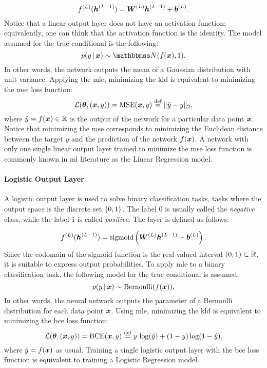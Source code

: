 $$\Layer{f}{L}(\LayerVector{h}{L-1}) = \LayerMatrix{W}{L} \LayerVector{h}{L-1} + \LayerVector{b}{L}.$$
Notice that a linear output layer does not have an activation function; equivalently, one can think that the activation function is the identity. The model assumed for the true conditional is the following:
$$p(y \given \Vector{x}) \sim \Normal{f(\Vector{x})}{1}.$$
In other words, the network outputs the mean of a Gaussian distribution with unit variance. Applying the \gls{mle}, minimizing the \gls{kld} is equivalent to minimizing the \gls{mse} loss function:
$$\Loss(\Param, (\Vector{x}, y)) =\Fun{MSE}(\Vector{x}, y) \defeq \norm{\hat{y} - y}_2,$$
where $\hat{y} = f(\Vector{x}) \in \Real$ is the output of the network for a particular data point $\Vector{x}$.
Notice that minimizing the \gls{mse} corresponds to minimizing the Euclidean distance between the target $y$ and the prediction of the network $f(\Vector{x})$. A network with only one single linear output layer trained to minimize the \gls{mse} loss function is commonly known in \gls{ml} literature as the Linear Regression model.

\paragraph{Logistic Output Layer}
A logistic output layer is used to solve binary classification tasks, \ie tasks where the output space is the discrete set $\left\{ 0, 1 \right\}$. The label 0 is usually called the \emph{negative} class, while the label 1 is called \emph{positive}. The layer is defined as follows:

$$\Layer{f}{L}(\LayerVector{h}{L-1}) = \sigmoid \Par{\LayerMatrix{W}{L} \LayerVector{h}{L-1} + \LayerVector{b}{L}}.$$
Since the codomain of the sigmoid function is the real-valued interval $(0, 1) \subset \mathbb{R}$, it is suitable to express output probabilities. To apply \gls{mle} to a binary classification task, the following model for the true conditional is assumed:
$$p(y \given \Vector{x}) \sim \Fun{Bernoulli}(f(\Vector{x})),$$
In other words, the neural network outputs the parameter of a Bernoulli distribution for each data point $\Vector{x}$. Using \gls{mle}, minimizing the \gls{kld} is equivalent to minimizing the \gls{bce} loss function:
$$\Loss(\Param, (\Vector{x}, y)) = \Fun{BCE}(\Vector{x},y) \defeq y\, \log(\hat{y}) + ( 1 - y) \log(1 - \hat{y}),$$
where $\hat{y} = f(\Vector{x})$ as usual. Training a single logistic output layer with the \gls{bce} loss function is equivalent to training a Logistic Regression model.

